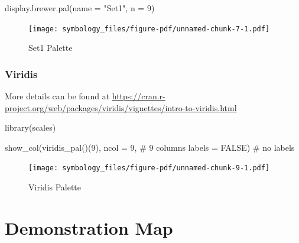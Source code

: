 \documentclass[
  letterpaper,
  DIV=11,
  numbers=noendperiod,
  oneside]{scrreprt}
\newenvironment{Shaded}{\begin{snugshade}}{\end{snugshade}}
\newcommand{\AttributeTok}[1]{\textcolor[rgb]{0.40,0.45,0.13}{#1}}
\newcommand{\CommentTok}[1]{\textcolor[rgb]{0.37,0.37,0.37}{#1}}
\newcommand{\ConstantTok}[1]{\textcolor[rgb]{0.56,0.35,0.01}{#1}}
\newcommand{\DecValTok}[1]{\textcolor[rgb]{0.68,0.00,0.00}{#1}}
\newcommand{\FunctionTok}[1]{\textcolor[rgb]{0.28,0.35,0.67}{#1}}
\newcommand{\NormalTok}[1]{\textcolor[rgb]{0.00,0.23,0.31}{#1}}
\newcommand{\StringTok}[1]{\textcolor[rgb]{0.13,0.47,0.30}{#1}}
\begin{document}
\begin{Shaded}
\begin{Highlighting}[]
\FunctionTok{display.brewer.pal}\NormalTok{(}\AttributeTok{name =} \StringTok{"Set1"}\NormalTok{, }\AttributeTok{n =} \DecValTok{9}\NormalTok{)}
\end{Highlighting}
\end{Shaded}

\begin{figure}[H]

{\centering \texttt{[image: symbology\_files/figure-pdf/unnamed-chunk-7-1.pdf]}

}

\caption{Set1 Palette}

\end{figure}%

\subsection{Viridis}\label{viridis}

More details can be found at
\url{https://cran.r-project.org/web/packages/viridis/vignettes/intro-to-viridis.html}

\begin{Shaded}
\begin{Highlighting}[]
\FunctionTok{library}\NormalTok{(scales)}
\end{Highlighting}
\end{Shaded}

\begin{Shaded}
\begin{Highlighting}[]
\FunctionTok{show\_col}\NormalTok{(}\FunctionTok{viridis\_pal}\NormalTok{()(}\DecValTok{9}\NormalTok{), }
         \AttributeTok{ncol =} \DecValTok{9}\NormalTok{, }\CommentTok{\# 9 columns}
         \AttributeTok{labels =} \ConstantTok{FALSE}\NormalTok{) }\CommentTok{\# no labels }
\end{Highlighting}
\end{Shaded}

\begin{figure}[H]

{\centering \texttt{[image: symbology\_files/figure-pdf/unnamed-chunk-9-1.pdf]}

}

\caption{Viridis Palette}

\end{figure}%

\chapter{Demonstration Map}\label{demonstration-map}
\end{document}
